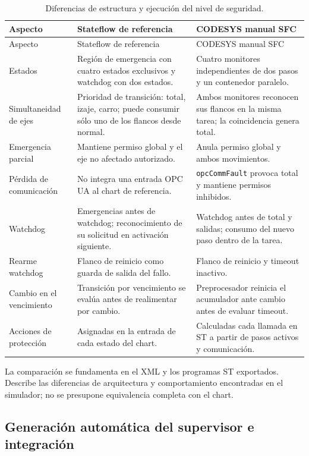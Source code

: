 \documentclass[a4paper,10pt,onecolumn,journal]{ieeeconf}
\numberwithin{equation}{section}
\begin{document}
{\footnotesize
\begin{longtable}{L{3.0cm} L{5.8cm} L{5.8cm}}
\caption{Diferencias de estructura y ejecución del nivel de seguridad.}\label{tab:comparacion_seg_sfc}\\
\toprule Aspecto & Stateflow de referencia & CODESYS manual SFC\\\midrule
\endfirsthead
\toprule Aspecto & Stateflow de referencia & CODESYS manual SFC\\\midrule
\endhead
Estados & Región de emergencia con cuatro estados exclusivos y watchdog con dos estados. & Cuatro monitores independientes de dos pasos y un contenedor paralelo.\\
Simultaneidad de ejes & Prioridad de transición: total, izaje, carro; puede consumir sólo uno de los flancos desde normal. & Ambos monitores reconocen sus flancos en la misma tarea; la coincidencia genera total.\\
Emergencia parcial & Mantiene permiso global y el eje no afectado autorizado. & Anula permiso global y ambos movimientos.\\
Pérdida de comunicación & No integra una entrada OPC UA al chart de referencia. & \texttt{opcCommFault} provoca total y mantiene permisos inhibidos.\\
Watchdog & Emergencias antes de watchdog; reconocimiento de su solicitud en activación siguiente. & Watchdog antes de total y salidas; consumo del nuevo paso dentro de la tarea.\\
Rearme watchdog & Flanco de reinicio como guarda de salida del fallo. & Flanco de reinicio y timeout inactivo.\\
Cambio en el vencimiento & Transición por vencimiento se evalúa antes de realimentar por cambio. & Preprocesador reinicia el acumulador ante cambio antes de evaluar timeout.\\
Acciones de protección & Asignadas en la entrada de cada estado del chart. & Calculadas cada llamada en ST a partir de pasos activos y comunicación.\\
\bottomrule
\end{longtable}}

La comparación se fundamenta en el XML y los programas ST exportados. Describe las diferencias de arquitectura y comportamiento encontradas en el simulador; no se presupone equivalencia completa con el chart.


\subsection{Generación automática del supervisor e integración}
\label{subsec:sup_generado_codesys}
\end{document}

